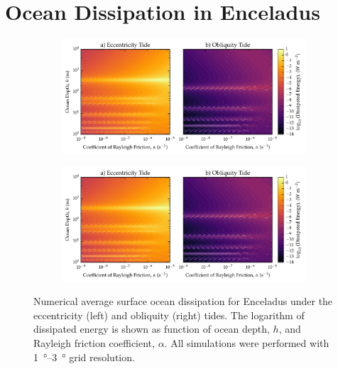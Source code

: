 \section{Ocean Dissipation in Enceladus \label{sec:results_Enceladus}}

\begin{figure}[!t]
    \centering
    \begin{subfigure}[t]{0.9\linewidth} %
        \includegraphics[width=\linewidth]{Figures/enceladus_linear}
        \label{fig:lincEccEncel}
    \end{subfigure}
    \begin{subfigure}[t]{0\linewidth} %
         \includegraphics[width=\linewidth]{Figures/enceladus_linear}
         \label{fig:linObliqEncel} 
    \end{subfigure}
    \vspace{-0.5cm}
\caption{Numerical average surface ocean dissipation for Enceladus under the eccentricity (left) and obliquity (right) tides. The logarithm of dissipated energy is shown as function of ocean depth, $h$, and Rayleigh friction coefficient, $\alpha$. All simulations were performed with \SIrange{1}{3}{\degree} grid resolution. \label{fig:linEncel}}
\end{figure}

